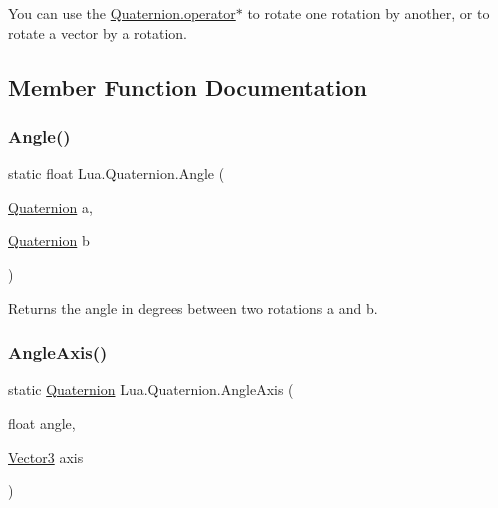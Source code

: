 You can use the \mbox{\hyperlink{class_lua_1_1_quaternion_af6d179e922217cf36197ed89c6cff2a4}{Quaternion.\+operator$\ast$}} to rotate one rotation by another, or to rotate a vector by a rotation. 

\subsection{Member Function Documentation}
\mbox{\label{class_lua_1_1_quaternion_a4094309a8c66c50017bd92ffdfeb3bfd}} 
\subsubsection{\texorpdfstring{Angle()}{Angle()}}
{\footnotesize\ttfamily static float Lua.\+Quaternion.\+Angle (\begin{DoxyParamCaption}\item[{\mbox{\hyperlink{class_lua_1_1_quaternion}{Quaternion}}}]{a,  }\item[{\mbox{\hyperlink{class_lua_1_1_quaternion}{Quaternion}}}]{b }\end{DoxyParamCaption})\hspace{0.3cm}{\ttfamily [static]}}



Returns the angle in degrees between two rotations a and b. 

\mbox{\label{class_lua_1_1_quaternion_a25f65fcc019124366264558209108498}} 
\subsubsection{\texorpdfstring{AngleAxis()}{AngleAxis()}}
{\footnotesize\ttfamily static \mbox{\hyperlink{class_lua_1_1_quaternion}{Quaternion}} Lua.\+Quaternion.\+Angle\+Axis (\begin{DoxyParamCaption}\item[{float}]{angle,  }\item[{\mbox{\hyperlink{class_lua_1_1_vector3}{Vector3}}}]{axis }\end{DoxyParamCaption})\hspace{0.3cm}{\ttfamily [static]}}



